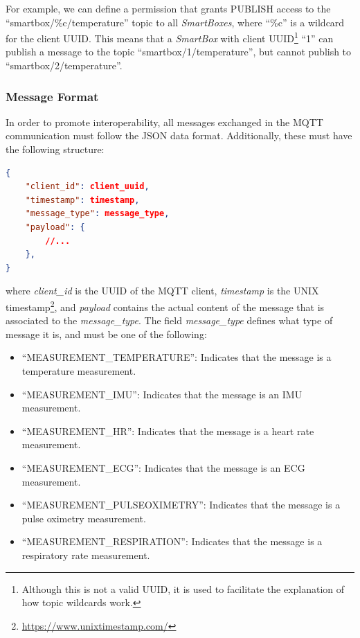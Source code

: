 


For example, we can define a permission that grants PUBLISH access to the ``smartbox/\%c/temperature'' topic to all \textit{SmartBoxes}, where ``\%c'' is a wildcard for the client \acs{UUID}. This means that a \textit{SmartBox} with client \acs{UUID}\footnote{Although this is not a valid \acs{UUID}, it is used to facilitate the explanation of how topic wildcards work.} ``1'' can publish a message to the topic ``smartbox/1/temperature'', but cannot publish to ``smartbox/2/temperature''.

\clearpage 
\subsubsection{Message Format}
\label{sec:mqtt payload format}
In order to promote interoperability, all messages exchanged in the \acs{MQTT} communication must follow the \acs{JSON} data format. Additionally, these must have the following structure:

\begin{lstlisting}[language=json]
{
    "client_id": client_uuid, 
    "timestamp": timestamp,
    "message_type": message_type,
    "payload": {
        //...
    }, 
}  
\end{lstlisting}

where \textit{client\_id} is the \acs{UUID} of the \acs{MQTT} client, \textit{timestamp} is the UNIX timestamp\footnote{\url{https://www.unixtimestamp.com/}}, and \textit{payload} contains the actual content of the message that is associated to the \textit{message\_type}. The field \textit{message\_type} defines what type of message it is, and must be one of the following:

\begin{itemize}
    \item ``MEASUREMENT\_TEMPERATURE'': Indicates that the message is a temperature measurement.
    \item ``MEASUREMENT\_IMU'': Indicates that the message is an \acs{IMU} measurement.
    \item ``MEASUREMENT\_HR'': Indicates that the message is a heart rate measurement.
    \item ``MEASUREMENT\_ECG'': Indicates that the message is an \acs{ECG} measurement.
    \item ``MEASUREMENT\_PULSEOXIMETRY'': Indicates that the message is a pulse oximetry measurement.
    \item ``MEASUREMENT\_RESPIRATION'': Indicates that the message is a respiratory rate measurement.
\end{itemize}

